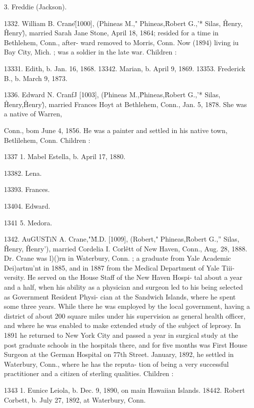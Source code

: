 \documentclass{book}
\begin{document}
3. Freddie (Jackson). 

1332. William B. Crane\^ [1000], (Phineas M.," Phineas,\^ 
Robert G.,'* Silas, \^ Henry, \^ Henry\^), married Sarah Jane Stone, 
April 18, 1864; resided for a time in Bethlehem, Conn., after- 
ward removed to Morris, Conn. Now (1894) living iu Bay City, 
Mich. ; was a soldier in the late war. Children : 

13331. Edith, b. Jan. 16, 1868. 
13342. Marian, b. April 9, 1869. 
13353. Frederick B., b. March 9, 1873. 

1336. Edward N. CranfJ [1003], (Phineas M.,\^ Phineas,\^ 
Robert G.,'* Silas, \^ Henry,\^ Henry\^), married Frances Hoyt at 
Bethlehem, Conn., Jan. 5, 1878. She was a native of Warren, 




Conn., bom June 4, 1856. He was a painter and settled in his 
native town, Betlilehem, Conn. Children : 

1337  1. Mabel Estella, b. April 17, 1880. 

13382. Lena. 

13393. Frances. 

13404. Edward. 

1341  5. Medora. 

1342. AuGUSTiN A. Crane,"\^ M.D. [1009], (Robert," Phineas,\^ 
Robert G.,'' Silas, \^ Henry, \^ Henry'), married Cordelia I. Corl\^ett 
of New Haven, Conn., Aug. 28, 1888. Dr. Crane was l)()rn in 
Waterbury, Conn. ; a graduate from Yale Academic Dei)artnu'nt 
in 1885, and in 1887 from the Medical Department of Yale Tiii- 
versity. He served on the House Staff of the New Haven Hospi- 
tal about a year and a half, when his ability as a physician and 
surgeon led to his being selected as Government Resident Physi- 
cian at the Sandwich Islands, where he spent some three years. 
While there he was employed by the local government, having a 
district of about 200 square miles under his supervision as general 
health officer, and where he was enabled to make extended study 
of the subject of leprosy. In 1891 he returned to New York 
City and passed a year in surgical study at the post graduate 
schools in the hospitals there, and for five months was First 
House Surgeon at the German Hospital on 77th Street. January, 
1892, he settled in Waterbury, Conn., where he has the reputa- 
tion of being a very successful practitioner and a citizen of 
sterling qualities. Children : 

1343  1. Eunice Leiola, b. Dec. 9, 1890, on main Hawaiian Islands. 
18442. Robert Corbett, b. July 27, 1892, at Waterbury, Conn. 
\end{document}

